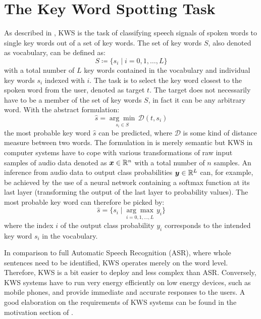 
\section{The Key Word Spotting Task}\label{sec:intro_kws}
As described in , KWS is the task of classifying speech signals of spoken words to single key words out of a set of key words.
The set of key words $S$, also denoted as vocabulary, can be defined as:
\begin{equation}\label{eq:intro_kws_dict}
	S \coloneqq \{s_i \mid i = 0, 1, \dots, L\}
\end{equation}
with a total number of $L$ key words contained in the vocabulary and individual key words $s_i$ indexed with $i$.
The task is to select the key word closest to the spoken word from the user, denoted as target $t$.
The target does not necessarily have to be a member of the set of key words $S$, in fact it can be any arbitrary word.
With the abstract formulation:
\begin{equation}\label{eq:intro_kws_task}
	\hat{s} = \underset{s_i \in S}{\arg \min} \, \mathcal{D}(t, s_i)
\end{equation}
the most probable key word $\hat{s}$ can be predicted, where $\mathcal{D}$ is some kind of distance measure between two words.
The formulation in  is merely semantic but KWS in computer systems have to cope with various transformations of raw input samples of audio data denoted as $\bm{x} \in \mathbb{R}^n$ with a total number of $n$ samples.
An inference from audio data to output class probabilities $\bm{y} \in \mathbb{R}^L$ can, for example, be achieved by the use of a neural network containing a softmax function at its last layer (transforming the output of the last layer to probability values).
The most probable key word can therefore be picked by:
\begin{equation}\label{eq:intro_kws_class}
	\hat{s} = \{s_i \mid \underset{i = 0, 1, \dots, L}{\arg \max} \, y_i\}
\end{equation}
where the index $i$ of the output class probability $y_i$ corresponds to the intended key word $s_i$ in the vocabulary.

In comparison to full Automatic Speech Recognition (ASR), where whole sentences need to be identified, KWS operates merely on the word level.
Therefore, KWS is a bit easier to deploy and less complex than ASR.
Conversely, KWS systems have to run very energy efficiently on low energy devices, such as mobile phones, and provide immediate and accurate responses to the users.
A good elaboration on the requirements of KWS systems can be found in the motivation section of \cite{Warden2018}.